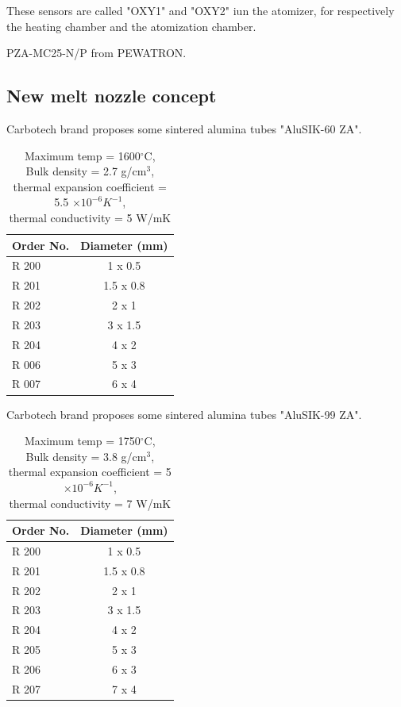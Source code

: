 \documentclass[../main.tex]{subfiles}
\begin{document}
These sensors are called "OXY1" and "OXY2" iun the atomizer, for respectively the heating chamber and the atomization chamber.

PZA-MC25-N/P from PEWATRON.

\subsection{New melt nozzle concept}

Carbotech brand proposes some sintered alumina tubes "AluSIK-60 ZA".

\vspace{0mm}
\begin{table}[H]
    \centering
    \begin{tabular}{l c}
        \toprule
        \textbf{Order No.} & \textbf{Diameter (mm)} \\
        \midrule
        R 200 & 1 x 0.5 \\
        R 201 & 1.5 x 0.8 \\
        R 202 & 2 x 1 \\
        R 203 & 3 x 1.5 \\
        R 204 & 4 x 2 \\
        R 006 & 5 x 3 \\
        R 007 & 6 x 4 \\
        \bottomrule
    \end{tabular}
    \caption{Maximum temp = 1600$^\circ$C,\\
    Bulk density = 2.7 g/cm$^3$,\\
    thermal expansion coefficient = 5.5 $\times 10^{-6} K^{-1}$,\\
    thermal conductivity = 5 W/mK}
    \label{}
\end{table}
\FloatBarrier
\vspace{0mm}

Carbotech brand proposes some sintered alumina tubes "AluSIK-99 ZA".

\vspace{0mm}
\begin{table}[H]
    \centering
    \begin{tabular}{l c}
        \toprule
        \textbf{Order No.} & \textbf{Diameter (mm)} \\
        \midrule
R 200 & 1 x 0.5 \\
R 201 & 1.5 x 0.8 \\
R 202 & 2 x 1 \\
R 203 & 3 x 1.5 \\
R 204 & 4 x 2 \\
R 205 & 5 x 3 \\
R 206 & 6 x 3 \\
R 207 & 7 x 4 \\
        \bottomrule
    \end{tabular}
    \caption{Maximum temp = 1750$^\circ$C,\\
    Bulk density = 3.8 g/cm$^3$,\\
    thermal expansion coefficient = 5 $\times 10^{-6} K^{-1}$,\\
    thermal conductivity = 7 W/mK}
    \label{}
\end{table}
\FloatBarrier
\vspace{0mm}
\end{document}
